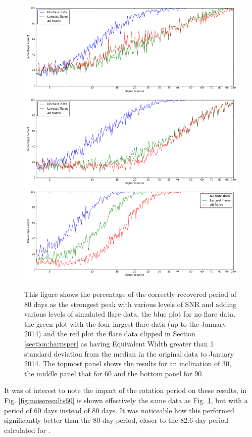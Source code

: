\begin{figure}[!htbp]
\begin{center}
\includegraphics[scale=0.25]{Figures/Np80.png} \\
\end{center}
\caption{This figure shows the percentage of the correctly recovered period of 80 days as the strongest peak with
  various levels of SNR and adding various levels of simulated flare data, the blue plot for no flare data. the green
  plot with the four largest flare data (up to the January 2014) and the red plot the flare data clipped in Section
  \ref{section:harpsper} as having Equivalent Width greater than 1 standard deviation from the median in the original
  data to January 2014.  The topmost panel shows the results for an inclination of 30{\degree}, the middle panel that
  for 60{\degree} and the bottom panel for 90{\degree}.}
\protect\label{fig:noiseresults}
\end{figure}

It was of interest to note the impact of the rotation period on these results, in Fig. \ref{fig:noiseresults60} is shown
effectively the same data as Fig. \ref{fig:noiseresults}, but with a period of 60 days instead of 80 days. It was
noticeable how this performed significantly better than the 80-day period, closer to the 82.6-day period calculated for
\prox.

